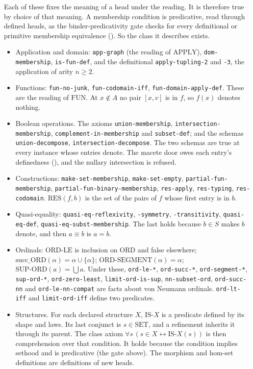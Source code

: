 Each of these fixes the meaning of a head under the reading.  It is
therefore true by choice of that meaning.  A membership condition is
predicative, read through defined heads, as the binder-predicativity
gate checks for every definitional or primitive membership equivalence
().  So the class it describes exists.
\begin{itemize}
\item Application and domain: \texttt{app-graph} (the reading of
  $\mathrm{APPLY}$), \texttt{dom-membership}, \texttt{is-fun-def}, and
  the definitional \texttt{apply-tupling-2} and \texttt{-3}, the
  application of arity $n\geq2$.
\item Functions: \texttt{fun-no-junk}, \texttt{fun-codomain-iff},
  \texttt{fun-domain-apply-def}.  These are the reading of
  $\mathrm{FUN}$.  At $x\notin A$ no pair $[x, v]$ is in $f$, so $f(x)$
  denotes nothing.
\item Boolean operations.  The axioms \texttt{union-membership},
  \texttt{intersection-membership},
  \texttt{complement-in-membership} and \texttt{subset-def}; and the
  schemas \texttt{union-decompose},
  \texttt{intersection-decompose}.  The two schemas are true at every
  instance whose entries denote.  The macete door owes each entry's
  definedness (), and the nullary intersection is refused.
\item Constructions: \texttt{make-set-membership},
  \texttt{make-set-empty}, \texttt{partial-fun-membership},
  \texttt{partial-fun-binary-membership}, \texttt{res-apply},
  \texttt{res-typing}, \texttt{res-codomain}.  $\mathrm{RES}(f,b)$ is the
  set of the pairs of $f$ whose first entry is in $b$.
\item Quasi-equality: \texttt{quasi-eq-reflexivity}, \texttt{-symmetry},
  \texttt{-transitivity}, \texttt{quasi-eq-def},
  \texttt{quasi-eq-subst-membership}.  The last holds because $b\in S$
  makes $b$ denote, and then $a\equiv b$ is $a=b$.
\item Ordinals: $\mathrm{ORD\text{-}LE}$ is inclusion on $\mathrm{ORD}$
  and false elsewhere; $\mathrm{succ\_ORD}(\alpha)=\alpha\cup\{\alpha\}$;
  $\mathrm{ORD\text{-}SEGMENT}(\alpha)=\alpha$;
  $\mathrm{SUP\text{-}ORD}(a)=\bigcup a$.  Under these, \texttt{ord-le-*},
  \texttt{ord-succ-*}, \texttt{ord-segment-*}, \texttt{sup-ord-*},
  \texttt{ord-zero-least}, \texttt{limit-ord-is-sup},
  \texttt{nn-subset-ord}, \texttt{ord-succ-nn} and
  \texttt{ord-le-nn-compat} are facts about von Neumann ordinals.
  \texttt{ord-lt-iff} and \texttt{limit-ord-iff} define two predicates.
\item Structures.  For each declared structure $X$, $\mathrm{IS\text{-}}X$
  is a predicate defined by its shape and laws.  Its last conjunct is
  $s\in\mathrm{SET}$, and a refinement inherits it through its parent.
  The class axiom $\forall s\,(s\in X\leftrightarrow\mathrm{IS\text{-}}X(s))$
  is then comprehension over that condition.  It holds because the
  condition implies sethood and is predicative (the gate above).  The
  morphism and hom-set definitions are definitions of new heads.
\end{itemize}

